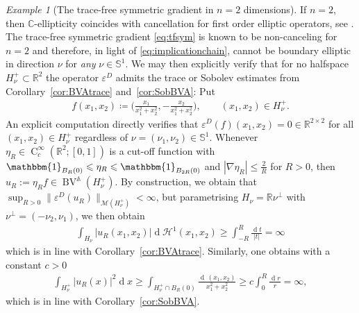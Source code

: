 \documentclass[a4paper,10pt]{amsart}
\newcommand{\R}{\mathbb R}
\renewcommand{\leq}{\leqslant}
\newcommand{\dif}{\mathrm{d}}
\renewcommand{\dif}{\operatorname{d}\!}
\newcommand{\hold}{\operatorname{C}}
\newcommand{\bv}{\operatorname{BV}}
\newcommand{\ball}{B}
\newcommand{\A}{\mathbb{A}}
\numberwithin{equation}{section}
\theoremstyle{remark}
\newtheorem{example}[theorem]{Example}
\numberwithin{equation}{section}
\begin{document}
	\begin{example}[The trace-free symmetric gradient in $n=2$ dimensions]
		If $n=2$, then $\mathbb{C}$-ellipticity coincides with cancellation for first order elliptic operators, see \cite{GR}. The trace-free symmetric gradient \eqref{eq:tfsym} is known to be non-canceling for $n=2$ and therefore, in light of \eqref{eq:implicationchain}, cannot be boundary elliptic in direction $\nu$ for \emph{any} $\nu\in\mathbb{S}^{1}$. We may then explicitly verify that for no halfspace $H_{\nu}^{+}\subset\R^{2}$ the operator $\varepsilon^{D}$ admits the trace or Sobolev estimates from Corollary~\ref{cor:BVAtrace} and~\ref{cor:SobBVA}: Put 
		\begin{align*}
			f(x_{1},x_{2})\coloneqq\Big(\frac{x_{1}}{x_{1}^{2}+x_{2}^{2}},-\frac{x_{2}}{x_{1}^{2}+x_{2}^{2}} \Big),\qquad (x_{1},x_{2})\in H_{\nu}^{+}.
		\end{align*}
		An explicit computation directly verifies that $\varepsilon^{D}(f)(x_{1},x_{2})=0\in\R^{2\times 2}$ for all $(x_{1},x_{2})\in H_{\nu}^{+}$ regardless of $\nu=(\nu_{1},\nu_{2})\in\mathbb{S}^{1}$. Whenever $\eta_{R}\in\hold_{c}^{\infty}(\R^{2};[0,1])$ is a cut-off function with $\mathbbm{1}_{\ball_{R}(0)}\leq \eta_{R}\leq \mathbbm{1}_{\ball_{2R}(0)}$ and $|\nabla\eta_{R}|\leq \frac{2}{R}$ for $R>0$, then $u_{R}:=\eta_{R}f\in\bv^{\A}(H_{\nu}^{+})$. By construction, we obtain that $\sup_{R>0}\|\varepsilon^{D}(u_{R})\|_{\mathcal{M}(H_{\nu}^{+})}<\infty$, but parametrising $H_{\nu}=\R\nu^{\bot}$ with $\nu^{\bot}=(-\nu_{2},\nu_{1})$, we then obtain 
		\begin{align*}
			\int_{H_{\nu}}|u_{R}(x_{1},x_{2})|\dif\mathscr{H}^{1}(x_{1},x_{2}) \geq \int_{-R}^{R}\frac{\dif t}{|t|} = \infty
		\end{align*}
		which is in line with Corollary~\ref{cor:BVAtrace}. Similarly, one obtains with a constant $c>0$
		\begin{align*}
			\int_{H_{\nu}^{+}}|u_{R}(x)|^{2}\dif x\geq \int_{H_{\nu}^{+}\cap\ball_{R}(0)}\frac{\dif\,(x_{1},x_{2})}{x_{1}^{2}+x_{2}^{2}} \geq c\int_{0}^{R}\frac{\dif r}{r} = \infty,  
		\end{align*}
		which is in line with Corollary~\ref{cor:SobBVA}. 
	\end{example}
\end{document}
